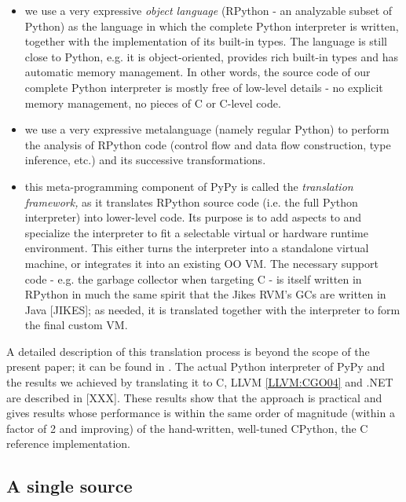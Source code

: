 \documentclass{llncs}
\begin{document}
\begin{itemize}

\item
we use a very expressive \emph{object language} (RPython - an analyzable
subset of Python) as the language in which the complete Python
interpreter is written, together with the implementation of its
built-in types.  The language is still close to Python, e.g.  it is
object-oriented, provides rich built-in types and has automatic memory
management.  In other words, the source code of our complete Python
interpreter is mostly free of low-level details - no explicit memory
management, no pieces of C or C-level code.

\item
we use a very expressive metalanguage (namely regular Python) to
perform the analysis of RPython code (control flow and data flow
construction, type inference, etc.) and its successive
transformations.

\item
this meta-programming component of PyPy is called the \emph{translation
framework,} as it translates RPython source code (i.e. the full Python
interpreter) into lower-level code.  Its purpose is to add aspects to
and specialize the interpreter to fit a selectable virtual or hardware
runtime environment.  This either turns the interpreter into a
standalone virtual machine, or integrates it into an existing OO VM.
The necessary support code - e.g. the garbage collector when
targeting C - is itself written in RPython in much the same spirit
that the Jikes RVM's GCs are written in Java [JIKES]; as needed, it is
translated together with the interpreter to form the final custom VM.
\end{itemize}

A detailed description of this translation process is beyond the scope of the
present paper; it can be found in \cite{pypyvmconstruction}.  The actual Python
interpreter of PyPy and the results we achieved by translating it to C, LLVM
\ref{LLVM:CGO04} and .NET are described in [XXX].  These results show that the
approach is practical and gives results whose performance is within the same
order of magnitude (within a factor of 2 and improving) of the hand-written,
well-tuned CPython, the C reference implementation.

\subsection{A single source}
\end{document}
